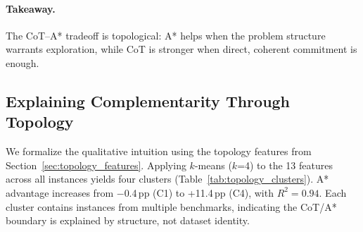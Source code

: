 \documentclass[11pt]{article}
\begin{document}
\paragraph{Takeaway.}
The CoT--A* tradeoff is topological: A* helps when the problem structure warrants exploration, while CoT is stronger when direct, coherent commitment is enough.
\subsection{Explaining Complementarity Through Topology}
\label{sec:topology_clusters}

We formalize the qualitative intuition using the topology features from Section~\ref{sec:topology_features}. Applying $k$-means ($k$=4) to the 13 features across all instances yields four clusters (Table~\ref{tab:topology_clusters}). A* advantage increases from $-$0.4\,pp (C1) to +11.4\,pp (C4), with $R^2 = 0.94$. Each cluster contains instances from multiple benchmarks, indicating the CoT/A* boundary is explained by structure, not dataset identity.

\begin{table}[t]
\centering
\small
{}
\caption{Reasoning topology clusters. BC = branching coefficient. A* advantage grows monotonically with branching complexity.}
\label{tab:topology_clusters}
\end{table}
\end{document}
